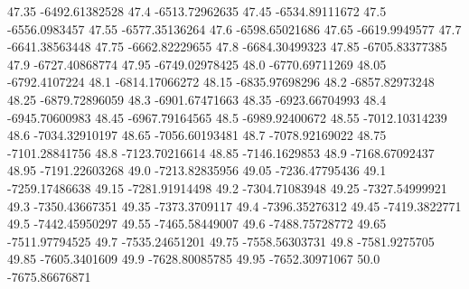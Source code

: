           47.35   -6492.61382528
           47.4   -6513.72962635
          47.45   -6534.89111672
           47.5    -6556.0983457
          47.55   -6577.35136264
           47.6   -6598.65021686
          47.65    -6619.9949577
           47.7   -6641.38563448
          47.75   -6662.82229655
           47.8   -6684.30499323
          47.85   -6705.83377385
           47.9   -6727.40868774
          47.95   -6749.02978425
           48.0   -6770.69711269
          48.05    -6792.4107224
           48.1   -6814.17066272
          48.15   -6835.97698296
           48.2   -6857.82973248
          48.25   -6879.72896059
           48.3   -6901.67471663
          48.35   -6923.66704993
           48.4   -6945.70600983
          48.45   -6967.79164565
           48.5   -6989.92400672
          48.55   -7012.10314239
           48.6   -7034.32910197
          48.65   -7056.60193481
           48.7   -7078.92169022
          48.75   -7101.28841756
           48.8   -7123.70216614
          48.85    -7146.1629853
           48.9   -7168.67092437
          48.95   -7191.22603268
           49.0   -7213.82835956
          49.05   -7236.47795436
           49.1   -7259.17486638
          49.15   -7281.91914498
           49.2   -7304.71083948
          49.25   -7327.54999921
           49.3   -7350.43667351
          49.35    -7373.3709117
           49.4   -7396.35276312
          49.45    -7419.3822771
           49.5   -7442.45950297
          49.55   -7465.58449007
           49.6   -7488.75728772
          49.65   -7511.97794525
           49.7   -7535.24651201
          49.75   -7558.56303731
           49.8    -7581.9275705
          49.85    -7605.3401609
           49.9   -7628.80085785
          49.95   -7652.30971067
           50.0   -7675.86676871
